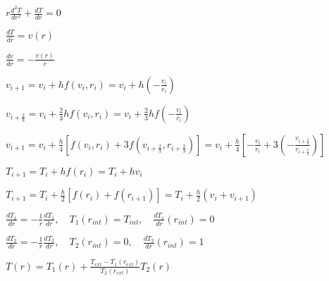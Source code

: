 \documentclass{article}
\begin{document}
$
r \frac{d^{2}T}{dr^{2}} + \frac{dT}{dr} = 0
$


$
\frac{dT}{dr} = v(r)
$

$
\frac{dv}{dr} = -\frac{v(r)}{r}
$

$
v_{i+1} = v_i + hf(v_i,r_i) = v_i + h(-\frac{v_i}{r_i})
$

$
v_{i+\frac{2}{3}} = v_i + \frac{2}{3}hf(v_i,r_i) = v_i + \frac{2}{3}hf(-\frac{v_i}{r_i})
$

$
v_{i+1} = v_i + \frac{h}{4}[f(v_i,r_i) + 3f(v_{i+\frac{2}{3}},r_{i+\frac{2}{3}})] = v_i + \frac{h}{4}[-\frac{v_i}{r_i} + 3(-\frac{v_{i+\frac{2}{3}}}{r_{i+\frac{2}{3}}})]
$

$
T_{i+1} = T_i + hf(r_i) = T_i + hv_i
$

$
T_{i+1} = T_i + \frac{h}{2}[f(r_i) + f(r_{i+1})] = T_i + \frac{h}{2}(v_i + v_{i+1})
$

$
\frac{dT_1}{dr}=-\frac{1}{r}\frac{dT_1}{dr} ,\quad T_1(r_{int})=T_{int} ,\quad \frac{dT_1}{dr}(r_{int}) = 0
$

$
\frac{dT_2}{dr}=-\frac{1}{r}\frac{dT_2}{dr} ,\quad T_2(r_{int})=0 ,\quad \frac{dT_2}{dr}(r_{int}) = 1
$

$
T(r) = T_1(r) + \frac{T_{ext}-T_1(r_{ext})}{T_2(r_{ext})}T_2(r)
$
\end{document}
